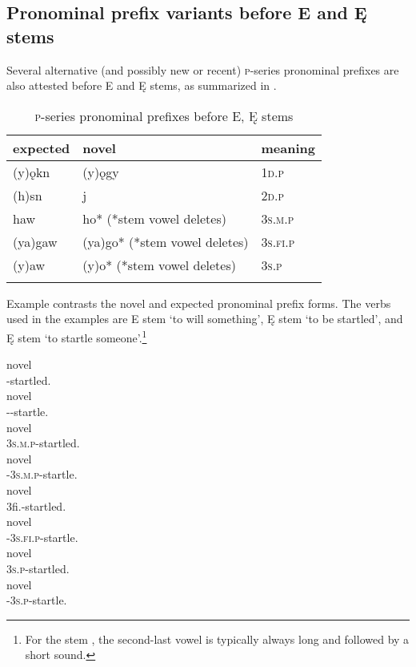 \subsection{Pronominal prefix variants before E and Ę stems}
Several alternative (and possibly new or recent) \textsc{p}-series pronominal prefixes are also attested before E and Ę stems, as summarized in . 

\begin{table}
\caption{\textsc{p}-series pronominal prefixes before E, Ę stems}
\label{figtab:1:obeforee}
{
\begin{tabularx}{\textwidth}{p{30mm}Xl}
\lsptoprule
expected & novel & meaning\\
\midrule
(y)ǫkn & (y)ǫgy & \textsc{1d.p}\\
(h)sn & j & \textsc{2d.p}\\
haw & ho* (*stem vowel deletes) & \textsc{3s.m.p} \\
(ya)gaw & (ya)go* (*stem vowel deletes) & \textsc{3s.fi.p} \\
(y)aw & (y)o* (*stem vowel deletes) & \textsc{3s.p}  \\
\lspbottomrule
\end{tabularx}}
\end{table}

Example  contrasts the novel and expected pronominal prefix forms. The verbs used in the examples are E stem  ‘to will something’, Ę stem  ‘to be startled’, and Ę stem  ‘to startle someone’.\footnote{For the stem , the second-last vowel is typically always long and followed by a short  sound.}

\ea\label{ex:ppvariation13} 
\ea novel 
\gll {}\\
-startled.{\stative}\\
\ex novel 
\gll {}\\
\fut--startle.{\punctual}\\
\ex novel 
\gll {} \\
\textsc{3s.m.p}-startled.{\stative}\\
\ex novel 
\gll {}\\
\fut-\textsc{3s.m.p}-startle.{\punctual}\\
\ex novel 
\gll {} \\
{3fi.\sgo}-startled.{\stative}\\
\ex novel 
\gll {} \\
\fut-\textsc{3s.fi.p}-startle.{\punctual}\\
\ex novel 
\gll {} \\
\textsc{3s.p}-startled.{\stative}\\
\ex novel 
\gll {} \\
\fut-\textsc{3s.p}-startle.{\punctual}\\
\z
\z
